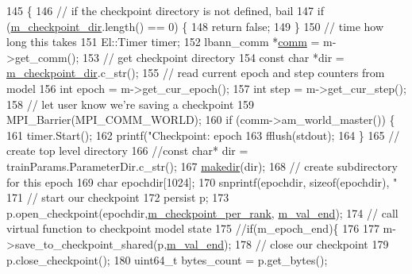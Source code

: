 \begin{DoxyCode}
145                                                          \{
146   \textcolor{comment}{// if the checkpoint directory is not defined, bail}
147   \textcolor{keywordflow}{if} (\hyperlink{classlbann_1_1lbann__callback__checkpoint_ac89386fda60744e6399f97003fea3711}{m\_checkpoint\_dir}.length() == 0) \{
148     \textcolor{keywordflow}{return} \textcolor{keyword}{false};
149   \}
150   \textcolor{comment}{// time how long this takes}
151   El::Timer timer;
152   lbann\_comm *\hyperlink{file__io_8cpp_ab048c6f9fcbcfaa57ce68b00263dbebe}{comm} = m->get\_comm();
153   \textcolor{comment}{// get checkpoint directory}
154   \textcolor{keyword}{const} \textcolor{keywordtype}{char} *dir = \hyperlink{classlbann_1_1lbann__callback__checkpoint_ac89386fda60744e6399f97003fea3711}{m\_checkpoint\_dir}.c\_str();
155   \textcolor{comment}{// read current epoch and step counters from model}
156   \textcolor{keywordtype}{int} epoch = m->get\_cur\_epoch();
157   \textcolor{keywordtype}{int} step  = m->get\_cur\_step();
158   \textcolor{comment}{// let user know we're saving a checkpoint}
159   MPI\_Barrier(MPI\_COMM\_WORLD);
160   \textcolor{keywordflow}{if} (comm->am\_world\_master()) \{
161     timer.Start();
162     printf(\textcolor{stringliteral}{"Checkpoint: epoch %
163     fflush(stdout);
164   \}
165   \textcolor{comment}{// create top level directory}
166   \textcolor{comment}{//const char* dir = trainParams.ParameterDir.c\_str();}
167   \hyperlink{namespacelbann_a8830dea8eef0ab5b93d68e2358ceeb1a}{makedir}(dir);
168   \textcolor{comment}{// create subdirectory for this epoch}
169   \textcolor{keywordtype}{char} epochdir[1024];
170   snprintf(epochdir, \textcolor{keyword}{sizeof}(epochdir), \textcolor{stringliteral}{"%
171   \textcolor{comment}{// start our checkpoint}
172   persist p;
173   p.open\_checkpoint(epochdir,\hyperlink{classlbann_1_1lbann__callback__checkpoint_a36af7331ddf213339fe7282cb53ffedc}{m\_checkpoint\_per\_rank}, 
      \hyperlink{classlbann_1_1lbann__callback__checkpoint_a3827e5bb569f80d790c3ac856a7c39b5}{m\_val\_end});
174   \textcolor{comment}{// call virtual function to checkpoint model state}
175   \textcolor{comment}{//if(m\_epoch\_end)\{}
176 
177   m->save\_to\_checkpoint\_shared(p,\hyperlink{classlbann_1_1lbann__callback__checkpoint_a3827e5bb569f80d790c3ac856a7c39b5}{m\_val\_end});
178   \textcolor{comment}{// close our checkpoint}
179   p.close\_checkpoint();
180   uint64\_t bytes\_count = p.get\_bytes();
}}
\end{DoxyCode}
